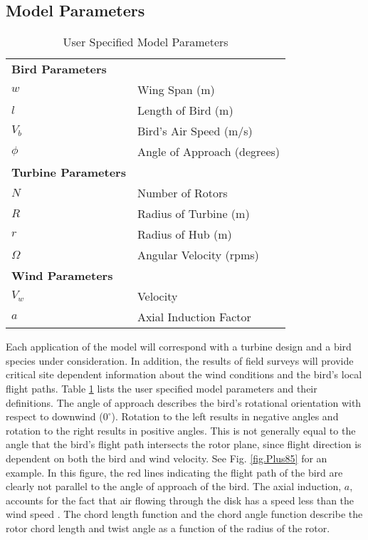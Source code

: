 \documentclass[10pt,conference]{IEEEtran}
\begin{document}
\subsection{Model Parameters}
\begin{table}
  \centering
  \vspace{1 mm}
  \begin{tabular}{|ll|}
  \hline
  \textbf{Bird Parameters} &\\
  $w$ & Wing Span (m)\\
  $l$ & Length of Bird (m)\\
  $V_b$ & Bird's Air Speed (m/s)\\
  $\phi$ & Angle of Approach (degrees)\\
  \hline
  \textbf{Turbine Parameters} & \\
  $N$ & Number of Rotors\\
  $R$ & Radius of Turbine (m)\\
  $r$ & Radius of Hub (m)\\
  $\Omega$ & Angular Velocity (rpms)\\
  \hline
  \textbf{Wind Parameters} &\\
  $V_w$ & Velocity\\
  $a$ & Axial Induction Factor\\
  \hline
  \end{tabular}
  \caption{User Specified Model Parameters}
  \label{table.user_parameters}
\end{table}


Each application of the model will correspond with a turbine design and a bird species under consideration. In
addition, the results of field surveys will provide critical site dependent information about the wind conditions and
the bird's local flight paths. Table \ref{table.user_parameters} lists the user specified model parameters and their
definitions. The angle of approach describes the bird's rotational orientation with respect to downwind ($0^\circ$).
Rotation to the left results in negative angles and rotation to the right results in positive angles. This is not
generally equal to the angle that the bird's flight path intersects the rotor plane, since flight direction is
dependent on both the bird and wind velocity. See Fig. \ref{fig.Plus85} for an example. In this figure, the red lines
indicating the flight path of the bird are clearly not parallel to the angle of approach of the bird. The axial
induction, $a$, accounts for the fact that air flowing through the disk has a speed less than the wind speed
\cite{Wilson1994}.
The chord length function and the chord angle function describe the rotor chord length and twist angle as a function of
the radius of the rotor.
\end{document}

